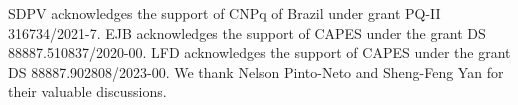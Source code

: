 \documentclass[a4paper,11pt]{article}
\begin{document}
\acknowledgments

SDPV acknowledges the support of CNPq of Brazil under grant PQ-II 316734/2021-7. EJB
acknowledges the support of CAPES under the grant DS 88887.510837/2020-00. LFD
acknowledges the support of CAPES under the grant DS 88887.902808/2023-00. We thank
Nelson Pinto-Neto and Sheng-Feng Yan for their valuable discussions.



\end{document}
